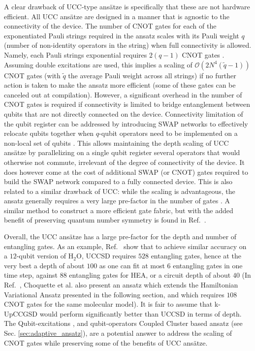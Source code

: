 A clear drawback of UCC-type ans{\"{a}}tze is specifically that these are not hardware efficient. All UCC ans\"atze are designed in a manner that is agnostic to the connectivity of the device. The number of CNOT gates for each of the exponentiated Pauli strings required in the ansatz scales with its Pauli weight $q$ (number of non-identity operators in the string) when full connectivity is allowed. Namely, each Pauli strings exponential requires $2(q - 1)$ CNOT gates \cite{nielsenQuantumComputationQuantum2010}. Assuming double excitations are used, this implies a scaling of $\mathcal{O}(2N^4(\tilde{q} -1))$ CNOT gates (with $\tilde{q}$ the average Pauli weight across all strings) if no further action is taken to make the ansatz more efficient (some of these gates can be canceled out at compilation). However, a significant overhead in the number of CNOT gates is required if connectivity is limited to bridge entanglement between qubits that are not directly connected on the device. Connectivity limitation of the qubit register can be addressed by introducing SWAP networks to effectively relocate qubits together when $q$-qubit operators need to be implemented on a non-local set of qubits \cite{OGorman2019}. This allows maintaining the depth scaling of UCC ans\"atze by parallelizing on a single qubit register several operators that would otherwise not commute, irrelevant of the degree of connectivity of the device. It does however come at the cost of additional SWAP (or CNOT) gates required to build the SWAP network compared to a fully connected device. This is also related to a similar drawback of UCC: while the scaling is advantageous, the ansatz generally requires a very large pre-factor in the number of gates \cite{Grimsley2019_UCC_Review, Romero2019, Choquette2021}. A similar method to construct a more efficient gate fabric, but with the added benefit of preserving quantum number symmetry is found in Ref.~\cite{Anselmetti2021}. 

Overall, the UCC ans\"atze has a large pre-factor for the depth and number of entangling gates. As an example, Ref.~\cite{Choquette2021} show that to achieve similar accuracy on a $12$-qubit version of $\mathrm{H_2O}$, UCCSD requires $528$ entangling gates, hence at the very best a depth of about $100$ as one can fit at most $6$ entangling gates in one time step, against $88$ entangling gates for HEA, or a circuit depth of about $40$ (In Ref.~\cite{Choquette2021}, Choquette et al. also present an ansatz which extends the Hamiltonian Variational Ansatz presented in the following section, and which requires $108$ CNOT gates for the same molecular model). It is fair to assume that k-UpCCGSD would perform significantly better than UCCSD in terms of depth. The Qubit-excitations \cite{Xia2020, Yordanov2020_QE, Yordanov2021}, and qubit-operators \cite{Ryabinkin2018, Ryabinkin2020, Tang2021} Coupled Cluster based ansatz (see Sec. \ref{sec:adaptive_ansatz}), are a potential answer to address the scaling of CNOT gates while preserving some of the benefits of UCC ans{\"{a}}tze. 

